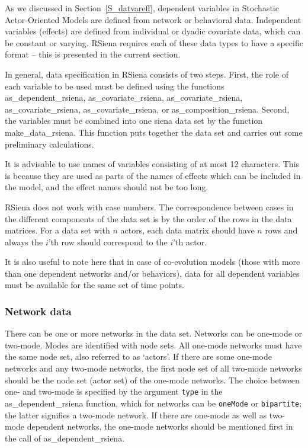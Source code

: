 \documentclass[a4paper,fleqn,11pt]{article}
\newcommand{\+}{\, + \,}
\newcommand{\sfn}[1]{\textsf{#1}}
\newcommand{\RS}{{\sf \textsf{RSiena} }}
\newcommand{\saom}{{Stochastic Actor-Oriented Model}}
\begin{document}
As we discussed in Section~\ref{S_datvareff}, dependent variables in {\saom}s are defined from
network or behavioral data. Independent variables (effects) are defined
from individual or dyadic covariate data, which can be constant or varying.
\RS requires each of these data types to have a specific format -- this is
presented in the current section.

In general, data specification in \RS consists of two steps.
First, the role of each variable to be used must be defined using
the functions \sfn{as\_dependent\_rsiena}, \sfn{as\_covariate\_rsiena}, \sfn{as\_covariate\_rsiena},
\sfn{as\_covariate\_rsiena}, \sfn{as\_covariate\_rsiena}, or \sfn{as\_composition\_rsiena}.
Second, the variables must be combined into one \sfn{siena} data set by the function
\sfn{make\_data\_rsiena}.
This function puts together the data set and carries out some
preliminary calculations.

It is advisable to use names of variables
consisting of at most 12 characters. This is because they are used as parts
of the names of effects which can be included in the model, and the effect
names should not be too long.

\RS does not work with case numbers. The correspondence between cases
in the different components of the data set is by the order of the rows
in the data matrices. For a data set with $n$ actors,
each data matrix should have $n$ rows and always the $i$'th row
should correspond to the $i$'th actor.

It is also useful to note here that in case of co-evolution models (those with
more than one dependent networks and/or behaviors), data for all dependent
variables must be available for the same set of time points.


\subsubsection{Network data}

There can be one or more networks in the data set.
Networks can be one-mode or two-mode.
Modes are identified with node sets.
All one-mode networks must have the same node set,
also referred to as `actors'.
If there are some one-mode networks and any two-mode networks,
the first node set of all two-mode networks should be the node set
(actor set) of the one-mode networks.
The choice between one- and two-mode is specified by the argument
\texttt{type} in  the \textsf{as\_dependent\_rsiena} function, which for
networks can be \texttt{oneMode} or \texttt{bipartite};
the latter signifies a two-mode network.
If there are one-mode as well as two-mode dependent networks,
the one-mode networks should be mentioned first in the call of
\textsf{as\_dependent\_rsiena}.
\end{document}
